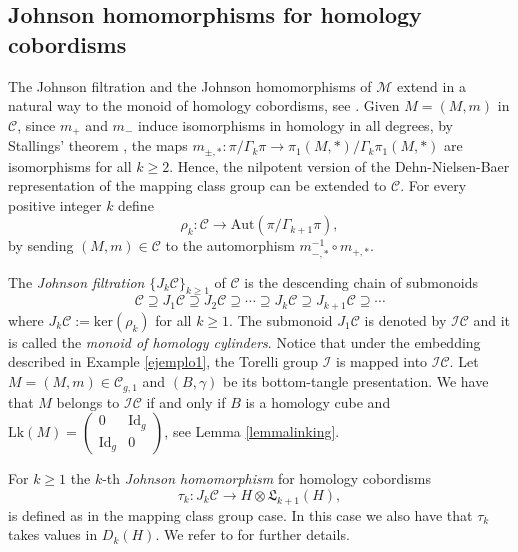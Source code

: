 \documentclass[10pt]{amsart}
\numberwithin{equation}{section}
\numberwithin{equation}{section}
\theoremstyle{definition}
\begin{document}
\subsection{Johnson homomorphisms for homology cobordisms}
The Johnson filtration and the Johnson homomorphisms of $\mathcal{M}$ extend in a natural way to the monoid of homology cobordisms, see  \cite{MR2131016}. Given $M=(M,m)$ in $\mathcal{C}$, since $m_+$ and $m_-$ induce isomorphisms in homology in all degrees,  by  Stallings' theorem  \cite[Theorem 3.4]{MR0175956}, the maps $m_{\pm,*}:\pi/\Gamma_k\pi\rightarrow\pi_1(M,*)/\Gamma_k\pi_1(M,*)$ are isomorphisms for all $k\geq 2$.  Hence, the  nilpotent version of the Dehn-Nielsen-Baer representation of the mapping class group  can be extended to  $\mathcal{C}$. For every positive integer $k$ define 
\begin{equation}\label{ecuacion2.3}%
\rho_{k}:\mathcal{C}\longrightarrow \text{Aut}(\pi/\Gamma_{k+1}\pi),
\end{equation}
\noindent by sending $(M,m)\in\mathcal{C}$ to  the automorphism $m_{-,*}^{-1}\circ m_{+,*}$.

The \emph{Johnson filtration} $\{J_k\mathcal{C}\}_{k\geq1}$ of $\mathcal{C}$ is the descending chain of submonoids 
$$\mathcal{C}\supseteq J_1\mathcal{C}\supseteq J_2\mathcal{C}\supseteq\cdots\supseteq J_k\mathcal{C}\supseteq J_{k+1}\mathcal{C}\supseteq\cdots$$
where  $J_k\mathcal{C}:=\text{ker}(\rho_{k})$ for all $k\geq1$. The submonoid $J_1\mathcal{C}$ is denoted by $\mathcal{IC}$ and it is called the \emph{monoid of homology cylinders}.  Notice that under the embedding  described in Example \ref{ejemplo1}, the Torelli group $\mathcal{I}$ is mapped into $\mathcal{IC}$. Let $M=(M,m)\in\mathcal{C}_{g,1}$ and $(B,\gamma)$ be its bottom-tangle presentation. We have that $M$ belongs to $\mathcal{IC}$ if and only if  $B$ is a homology cube and $\text{Lk}(M)=\left( \begin{smallmatrix} 0&\text{Id}_g\\ \text{Id}_g&0 \end{smallmatrix} \right)$, see Lemma \ref{lemmalinking}.

For $k\geq 1$ the $k$-th \emph{Johnson homomorphism} for homology cobordisms
\begin{equation}\label{ecuacion2.4}%
\tau_k: J_k\mathcal{C}\longrightarrow  H\otimes \mathfrak{L}_{k+1}(H),
\end{equation}
\noindent is defined as in the mapping class group case. In this case we also have that $\tau_k$ takes values in $D_k(H)$. We refer to \cite{MR2131016} for further details.
\end{document}
